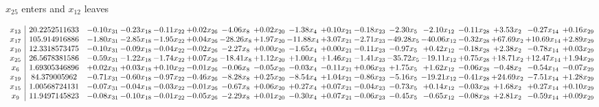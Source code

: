 \documentclass[9pt]{article}
\begin{document}
 $ x_{25} $ enters and $ x_{12} $ leaves 

 \[\begin{array}{c| c c@{\hskip 2pt} c@{\hskip 2pt} c@{\hskip 2pt} c@{\hskip 2pt} c@{\hskip 2pt} c@{\hskip 2pt} c@{\hskip 2pt} c@{\hskip 2pt} c@{\hskip 2pt} c@{\hskip 2pt} c@{\hskip 2pt} c@{\hskip 2pt} c@{\hskip 2pt} c@{\hskip 2pt} c@{\hskip 2pt} }
 x_{13}   &  20.2252511633 & -0.10 x_{31} & -0.23 x_{18} & -0.11 x_{22} & +  0.02 x_{26} & -4.06 x_{8} & +  0.02 x_{20} & -1.38 x_{4} & +  0.10 x_{21} & -0.18 x_{23} & -2.30 x_{5} & -2.10 x_{12} & -0.11 x_{28} & +  3.53 x_{2} & -0.27 x_{14} & +  0.16 x_{29}\\
 x_{17}   &  105.914916886 & -1.80 x_{31} & -2.85 x_{18} & -1.95 x_{22} & +  0.04 x_{26} & -28.26 x_{8} & +  1.97 x_{20} & -11.88 x_{4} & +  3.07 x_{21} & -2.71 x_{23} & -49.28 x_{5} & -40.06 x_{12} & -0.32 x_{28} & + 67.69 x_{2} & + 10.69 x_{14} & +  2.89 x_{29}\\
 x_{10}   &  12.3318573475 & -0.10 x_{31} & -0.09 x_{18} & -0.04 x_{22} & -0.02 x_{26} & -2.27 x_{8} & +  0.00 x_{20} & -1.65 x_{4} & +  0.00 x_{21} & -0.11 x_{23} & -0.97 x_{5} & +  0.42 x_{12} & -0.18 x_{28} & +  2.38 x_{2} & -0.78 x_{14} & +  0.03 x_{29}\\
 x_{25}   &  26.5678381586 & -0.59 x_{31} & -1.22 x_{18} & -1.74 x_{22} & +  0.07 x_{26} & -18.41 x_{8} & +  1.12 x_{20} & +  1.00 x_{4} & +  1.46 x_{21} & -1.41 x_{23} & -35.72 x_{5} & -19.11 x_{12} & +  0.75 x_{28} & + 18.71 x_{2} & + 12.47 x_{14} & +  1.94 x_{29}\\
 x_{6}   &  1.69305346896 & +  0.02 x_{31} & +  0.03 x_{18} & +  0.10 x_{22} & -0.01 x_{26} & -0.06 x_{8} & -0.05 x_{20} & -0.03 x_{4} & -0.11 x_{21} & +  0.06 x_{23} & +  1.75 x_{5} & +  1.62 x_{12} & -0.06 x_{28} & -0.48 x_{2} & -0.54 x_{14} & -0.07 x_{29}\\
 x_{19}   &  84.379005962 & -0.71 x_{31} & -0.60 x_{18} & -0.97 x_{22} & -0.46 x_{26} & -8.28 x_{8} & +  0.25 x_{20} & -8.54 x_{4} & +  1.04 x_{21} & -0.86 x_{23} & -5.16 x_{5} & -19.21 x_{12} & -0.41 x_{28} & + 24.69 x_{2} & -7.51 x_{14} & +  1.28 x_{29}\\
 x_{15}   &  1.00568724131 & -0.07 x_{31} & -0.04 x_{18} & -0.03 x_{22} & -0.01 x_{26} & -0.67 x_{8} & +  0.06 x_{20} & +  0.27 x_{4} & +  0.07 x_{21} & -0.04 x_{23} & -0.73 x_{5} & +  0.14 x_{12} & -0.03 x_{28} & +  1.68 x_{2} & +  0.27 x_{14} & +  0.10 x_{29}\\
 x_{9}   &  11.9497145823 & -0.08 x_{31} & -0.10 x_{18} & -0.01 x_{22} & -0.05 x_{26} & -2.29 x_{8} & +  0.01 x_{20} & -0.30 x_{4} & +  0.07 x_{21} & -0.06 x_{23} & -0.45 x_{5} & -0.65 x_{12} & -0.08 x_{28} & +  2.81 x_{2} & -0.59 x_{14} & +  0.09 x_{29}\\

\end{array}\]
\end{document}
